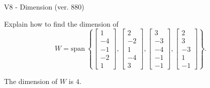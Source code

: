 \begin{exercise}
  \begin{exerciseTitle}V8 - Dimension (ver. 880)\end{exerciseTitle}
  \begin{exerciseStatement}
    Explain how to find the dimension of 
\[W=\mathrm{span}\ \left\{\left[\begin{array}{r}
1 \\
-4 \\
-1 \\
-2 \\
1
\end{array}\right] , \left[\begin{array}{r}
2 \\
-2 \\
1 \\
-4 \\
3
\end{array}\right] , \left[\begin{array}{r}
3 \\
-3 \\
-4 \\
-1 \\
-1
\end{array}\right] , \left[\begin{array}{r}
2 \\
3 \\
-3 \\
1 \\
-1
\end{array}\right]\right\}.\]



  \end{exerciseStatement}
  \begin{exerciseAnswer}
   The dimension of \(W\) is  \(4\).
  


  \end{exerciseAnswer}
\end{exercise}